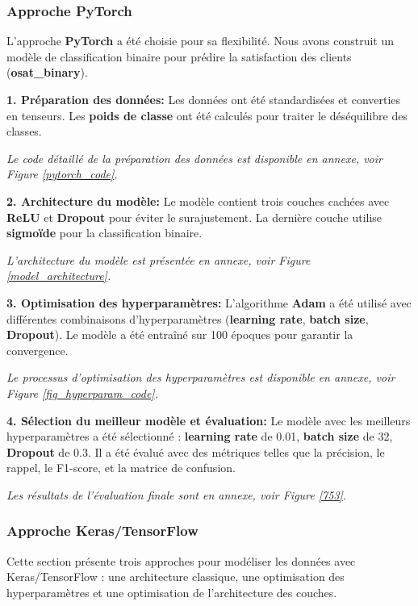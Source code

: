 \subsubsection{Approche PyTorch}
L'approche \textbf{PyTorch} a été choisie pour sa flexibilité. Nous avons construit un modèle de classification binaire pour prédire la satisfaction des clients (\textbf{osat\_binary}).

\textbf{1. Préparation des données:} Les données ont été standardisées et converties en tenseurs. Les \textbf{poids de classe} ont été calculés pour traiter le déséquilibre des classes. 

\textit{Le code détaillé de la préparation des données est disponible en annexe, voir Figure \ref{pytorch_code}.}

\textbf{2. Architecture du modèle:} Le modèle contient trois couches cachées avec \textbf{ReLU} et \textbf{Dropout} pour éviter le surajustement. La dernière couche utilise \textbf{sigmoïde} pour la classification binaire.

\textit{L'architecture du modèle est présentée en annexe, voir Figure \ref{model_architecture}.}

\textbf{3. Optimisation des hyperparamètres:} L'algorithme \textbf{Adam} a été utilisé avec différentes combinaisons d'hyperparamètres (\textbf{learning rate}, \textbf{batch size}, \textbf{Dropout}). Le modèle a été entraîné sur 100 époques pour garantir la convergence. 

\textit{Le processus d'optimisation des hyperparamètres est disponible en annexe, voir Figure \ref{fig_hyperparam_code}.}

\textbf{4. Sélection du meilleur modèle et évaluation:} Le modèle avec les meilleurs hyperparamètres a été sélectionné : \textbf{learning rate} de 0.01, \textbf{batch size} de 32, \textbf{Dropout} de 0.3. Il a été évalué avec des métriques telles que la précision, le rappel, le F1-score, et la matrice de confusion.

\textit{Les résultats de l'évaluation finale sont en annexe, voir Figure \ref{753}.}

\subsubsection{Approche Keras/TensorFlow}

Cette section présente trois approches pour modéliser les données avec Keras/TensorFlow : une architecture classique, une optimisation des hyperparamètres et une optimisation de l'architecture des couches.


